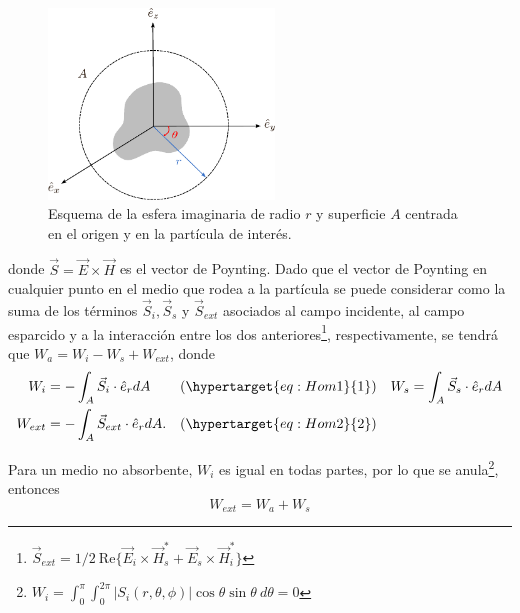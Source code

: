 \begin{figure}%
	\centering
	\includegraphics[width=6cm]{../../Figuras/WA}
	\caption{Esquema de la esfera imaginaria  de radio $r$ y superficie $A$ centrada en el origen y en la partícula de interés.}
	\label{WA}
\end{figure}
donde $\Vec{S}=\Vec{E}\times\Vec{H}$ es el vector de Poynting. Dado que el vector de Poynting en cualquier punto en el medio que rodea a la partícula se puede considerar como la suma de los términos $\Vec{S}_i, \Vec{S}_s$ y $\Vec{S}_{ext}$  \cite{Bohren} asociados al campo incidente, al campo esparcido y a la interacción entre los dos anteriores\footnote{$\Vec{S}_{ext}=1/2\:\mbox{Re}\{\Vec{E}_i\times\Vec{H}_s^*+\Vec{E}_s\times\Vec{H}_i^*\}$ }, respectivamente, se tendrá que $W_a=W_i-W_s+W_{ext}$, donde
\begin{subequations}
	\begin{align}
			W_i & = -\int_{A}\Vec{S}_i\cdot\hat{e}_rdA 
		&& (\stepcounter{equation}\hypertarget{eq:Hom1}{\text{\theequation}}) 
		& W_s &=\int_{A}\Vec{S}_s\cdot\hat{e}_rdA \label{eq:MW1a}\\
		W_{ext}& = -\int_{A}\Vec{S}_{ext}\cdot\hat{e}_rdA. && (\stepcounter{equation}\hypertarget{eq:Hom2}{\text{\theequation}}) & \nonumber
	\end{align}
\end{subequations}

Para un medio no absorbente, $W_i$ es igual en todas partes, por lo que se anula\footnote{$W_i =\int_{0}^{\pi}\int_{0}^{2\pi}|S_i(r,\theta,\phi)|\cos\theta \sin\theta \: d\theta=0$}, entonces
\begin{equation}
	W_{ext}=W_a+W_s
\end{equation}

